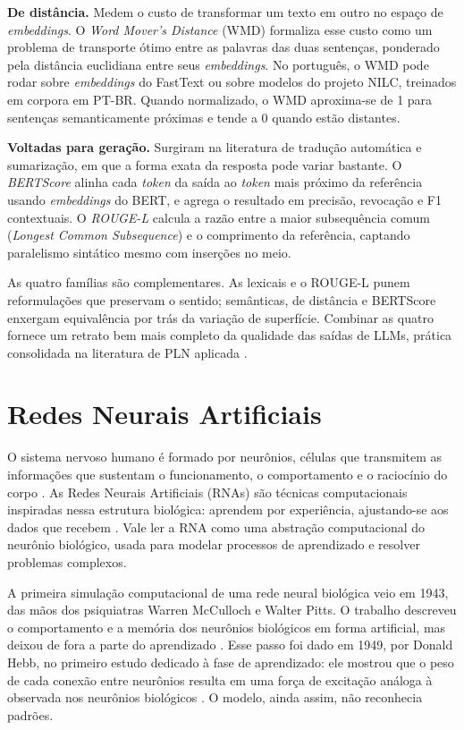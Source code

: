 \textbf{De distância.} Medem o custo de transformar um texto em outro no espaço de \textit{embeddings}. O \textit{Word Mover's Distance} (WMD) \cite{kusner2015} formaliza esse custo como um problema de transporte ótimo entre as palavras das duas sentenças, ponderado pela distância euclidiana entre seus \textit{embeddings}. No português, o WMD pode rodar sobre \textit{embeddings} do FastText \cite{bojanowski2017} ou sobre modelos do projeto NILC, treinados em corpora em PT-BR. Quando normalizado, o WMD aproxima-se de 1 para sentenças semanticamente próximas e tende a 0 quando estão distantes.

\textbf{Voltadas para geração.} Surgiram na literatura de tradução automática e sumarização, em que a forma exata da resposta pode variar bastante. O \textit{BERTScore} \cite{zhang2020bertscore} alinha cada \textit{token} da saída ao \textit{token} mais próximo da referência usando \textit{embeddings} do BERT, e agrega o resultado em precisão, revocação e F1 contextuais. O \textit{ROUGE-L} \cite{lin2004rouge} calcula a razão entre a maior subsequência comum (\textit{Longest Common Subsequence}) e o comprimento da referência, captando paralelismo sintático mesmo com inserções no meio.

As quatro famílias são complementares. As lexicais e o ROUGE-L punem reformulações que preservam o sentido; semânticas, de distância e BERTScore enxergam equivalência por trás da variação de superfície. Combinar as quatro fornece um retrato bem mais completo da qualidade das saídas de LLMs, prática consolidada na literatura de PLN aplicada \cite{reimers2019}.

\section{Redes Neurais Artificiais}

O sistema nervoso humano é formado por neurônios, células que transmitem as informações que sustentam o funcionamento, o comportamento e o raciocínio do corpo \cite{tafner1995}. As Redes Neurais Artificiais (RNAs) são técnicas computacionais inspiradas nessa estrutura biológica: aprendem por experiência, ajustando-se aos dados que recebem \cite{haykin1999}. Vale ler a RNA como uma abstração computacional do neurônio biológico, usada para modelar processos de aprendizado e resolver problemas complexos.

A primeira simulação computacional de uma rede neural biológica veio em 1943, das mãos dos psiquiatras Warren McCulloch e Walter Pitts. O trabalho descreveu o comportamento e a memória dos neurônios biológicos em forma artificial, mas deixou de fora a parte do aprendizado \cite{mcculloch1943}. Esse passo foi dado em 1949, por Donald Hebb, no primeiro estudo dedicado à fase de aprendizado: ele mostrou que o peso de cada conexão entre neurônios resulta em uma força de excitação análoga à observada nos neurônios biológicos \cite{hebb1949}. O modelo, ainda assim, não reconhecia padrões.

